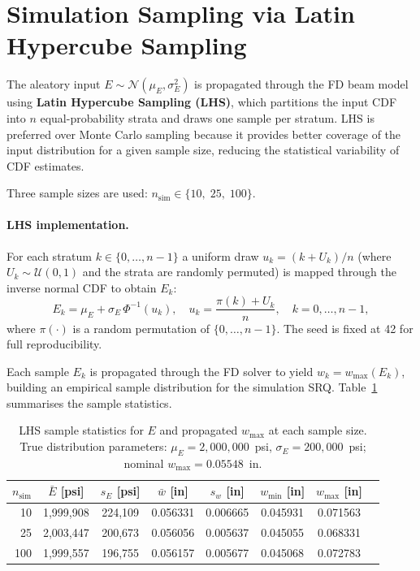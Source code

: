 \documentclass[11pt,letterpaper]{article}
\newcommand{\wmax}{w_{\max}}
\newcommand{\muE}{\mu_E}
\newcommand{\sigE}{\sigma_E}
\begin{document}
\section{Simulation Sampling via Latin Hypercube Sampling}
\label{sec:lhs}

The aleatory input $E \sim \mathcal{N}(\muE, \sigE^2)$ is propagated through the
FD beam model using \textbf{Latin Hypercube Sampling (LHS)}, which partitions
the input CDF into $n$ equal-probability strata and draws one sample per stratum.
LHS is preferred over Monte Carlo sampling because it provides better coverage
of the input distribution for a given sample size, reducing the statistical
variability of CDF estimates.

Three sample sizes are used:  $n_{\mathrm{sim}} \in \{10,\; 25,\; 100\}$.

\paragraph{LHS implementation.}
For each stratum $k \in \{0, \ldots, n-1\}$ a uniform draw $u_k = (k + U_k)/n$
(where $U_k \sim \mathcal{U}(0,1)$ and the strata are randomly permuted) is
mapped through the inverse normal CDF to obtain $E_k$:
\begin{equation}
  E_k = \muE + \sigE\,\Phi^{-1}(u_k),
  \quad
  u_k = \frac{\pi(k) + U_k}{n},
  \quad k=0,\ldots,n-1,
  \label{eq:lhs}
\end{equation}
where $\pi(\cdot)$ is a random permutation of $\{0,\ldots,n-1\}$.
The seed is fixed at 42 for full reproducibility.

Each sample $E_k$ is propagated through the FD solver to yield $w_k = \wmax(E_k)$,
building an empirical sample distribution for the simulation SRQ.
Table~\ref{tab:lhs} summarises the sample statistics.

\begin{table}[h!]
\centering
\caption{LHS sample statistics for $E$ and propagated $\wmax$ at each sample size.
  True distribution parameters: $\muE = 2{,}000{,}000$~psi, $\sigE = 200{,}000$~psi;
  nominal $\wmax = 0.05548$~in.}
\label{tab:lhs}
\small
\begin{tabular}{rccccccc}
  \toprule
  $n_{\mathrm{sim}}$ &
  $\bar{E}$ [psi] & $s_E$ [psi] &
  $\bar{w}$ [in] & $s_w$ [in] &
  $w_{\min}$ [in] & $w_{\max}$ [in] \\
  \midrule
   10 & 1,999,908 & 224,109 & 0.056331 & 0.006665 & 0.045931 & 0.071563 \\
   25 & 2,003,447 & 200,673 & 0.056056 & 0.005637 & 0.045055 & 0.068331 \\
  100 & 1,999,557 & 196,755 & 0.056157 & 0.005677 & 0.045068 & 0.072783 \\
  \bottomrule
\end{tabular}
\end{table}
\end{document}
